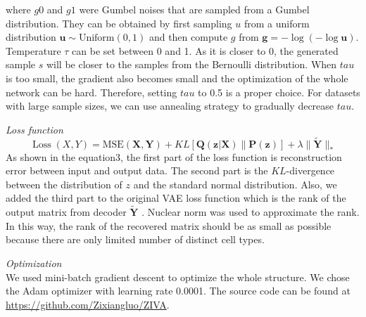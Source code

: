 where $g0$ and $g1$ were Gumbel noises that are sampled from a Gumbel distribution. They can be obtained by first sampling $u$ from a uniform distribution $\boldsymbol{u} \sim \text {Uniform}(0,1)$ and then compute $g$ from $\boldsymbol{g}=-\log (-\log \boldsymbol{u})$. Temperature $\tau$ can be set between 0 and 1. As it is closer to 0, the generated sample $s$ will be closer to the samples from the Bernoulli distribution. When $tau$ is too small, the gradient also becomes small and the optimization of the whole network can be hard. Therefore, setting $tau$ to 0.5 is a proper choice. For datasets with large sample sizes, we can use annealing strategy to gradually decrease $tau$.

\vspace{0.5cm}
\noindent\emph{Loss function} \\
\begin{equation}
    \operatorname{Loss}(X, Y)=\text {MSE}(\boldsymbol{X}, \boldsymbol{Y}) + 
    KL[\boldsymbol{Q}(\boldsymbol{z} | \boldsymbol{X}) \| \boldsymbol{P}(\boldsymbol{z})] + \lambda\|\mathbf{\widetilde{\boldsymbol{Y}}}\|_{*}
\end{equation}
As shown in the equation3, the first part of the loss function is reconstruction error between input and output data. The second part is the $KL$-divergence between the distribution of $z$ and the standard normal distribution. Also, we added the third part to the original VAE loss function which is the rank of the output matrix from decoder $\widetilde{\boldsymbol{Y}}$ . Nuclear norm was used to approximate the rank. In this way, the rank of the recovered matrix should be as small as possible because there are only limited number of distinct cell types. 

\vspace{0.5cm}
\noindent\emph{Optimization} \\
We used mini-batch gradient descent to optimize the whole structure. We chose the Adam optimizer with learning rate 0.0001. The source code can be found at \url{https://github.com/Zixiangluo/ZIVA}.

